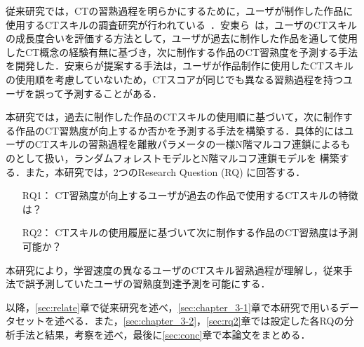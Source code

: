 \documentclass[submit,ses,noauthor]{ipsj}
\begin{document}
従来研究では，CTの習熟過程を明らかにするために，ユーザが制作した作品に使用するCTスキルの調査研究が行われている~\cite{Yang_2015}\cite{Troiano_2019}．安東ら~\cite{Ando_2021}は，ユーザのCTスキルの成長度合いを評価する方法として，ユーザが過去に制作した作品を通して使用したCT概念の経験有無に基づき，次に制作する作品のCT習熟度を予測する手法を開発した．安東らが提案する手法は，ユーザが作品制作に使用したCTスキルの使用順を考慮していないため，CTスコアが同じでも異なる習熟過程を持つユーザを誤って予測することがある．

本研究では，過去に制作した作品のCTスキルの使用順に基づいて，次に制作する作品のCT習熟度が向上するか否かを予測する手法を構築する．具体的にはユーザのCTスキルの習熟過程を離散パラメータの一様N階マルコフ連鎖によるものとして扱い，ランダムフォレストモデルとN階マルコフ連鎖モデルを
構築する．また，本研究では，2つのResearch Question (RQ) に回答する．

\begin{itemize}
\item[RQ1：]CT習熟度が向上するユーザが過去の作品で使用するCTスキルの特徴は？
\item[RQ2：]CTスキルの使用履歴に基づいて次に制作する作品のCT習熟度は予測可能か？
\end{itemize}

本研究により，学習速度の異なるユーザのCTスキル習熟過程が理解し，従来手法で誤予測していたユーザの習熟度到達予測を可能にする．


以降，\ref{sec:relate}章で従来研究を述べ，\ref{sec:chapter_3-1}章で本研究で用いるデータセットを述べる．また，\ref{sec:chapter_3-2}，\ref{sec:rq2}章では設定した各RQの分析手法と結果，考察を述べ，最後に\ref{sec:conc}章で本論文をまとめる．
\end{document}
